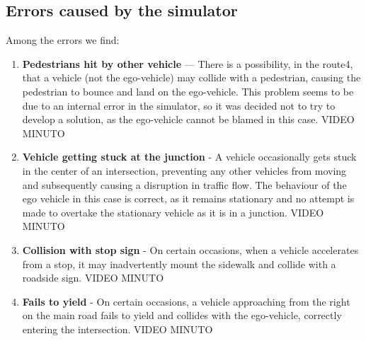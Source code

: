 \documentclass{article}
\begin{document}
\subsection{Errors caused by the simulator}
Among the errors we find:
\begin{enumerate}
    \item \textbf{Pedestrians hit by other vehicle} — There is a possibility, in the route4, that a vehicle (not the ego-vehicle) 
    may collide with a pedestrian, causing the pedestrian to bounce and land on the ego-vehicle. This problem seems to be due to 
    an internal error in the simulator, so it was decided not to try to develop a solution, as the ego-vehicle cannot be blamed 
    in this case. VIDEO MINUTO
    \item \textbf{Vehicle getting stuck at the junction} - A vehicle occasionally gets stuck in the center of an intersection, 
    preventing any other vehicles from moving and subsequently causing a disruption in traffic flow.
    The behaviour of the ego vehicle in this case is correct, as it remains stationary and no attempt is made to overtake the 
    stationary vehicle as it is in a junction. VIDEO MINUTO
    \item \textbf{Collision with stop sign} - On certain occasions, when a vehicle accelerates from a stop, it may inadvertently 
    mount the sidewalk and collide with a roadside sign. VIDEO MINUTO
    \item \textbf{Fails to yield} - On certain occasions, a vehicle approaching from the right on the main road fails to yield 
    and collides with the ego-vehicle, correctly entering the intersection. VIDEO MINUTO
\end{enumerate}
\end{document}
